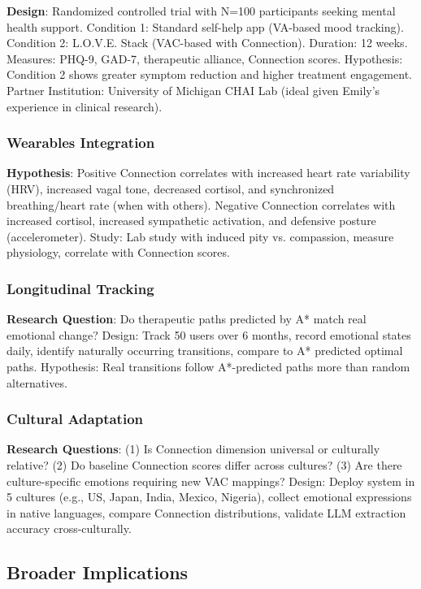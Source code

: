 \documentclass[10pt,twocolumn]{article}
\begin{document}
\textbf{Design}: Randomized controlled trial with N=100 participants seeking mental health support. Condition 1: Standard self-help app (VA-based mood tracking). Condition 2: L.O.V.E. Stack (VAC-based with Connection). Duration: 12 weeks. Measures: PHQ-9, GAD-7, therapeutic alliance, Connection scores. Hypothesis: Condition 2 shows greater symptom reduction and higher treatment engagement. Partner Institution: University of Michigan CHAI Lab (ideal given Emily's experience in clinical research).

\subsubsection{Wearables Integration}

\textbf{Hypothesis}: Positive Connection correlates with increased heart rate variability (HRV), increased vagal tone, decreased cortisol, and synchronized breathing/heart rate (when with others). Negative Connection correlates with increased cortisol, increased sympathetic activation, and defensive posture (accelerometer). Study: Lab study with induced pity vs. compassion, measure physiology, correlate with Connection scores.

\subsubsection{Longitudinal Tracking}

\textbf{Research Question}: Do therapeutic paths predicted by A* match real emotional change? Design: Track 50 users over 6 months, record emotional states daily, identify naturally occurring transitions, compare to A* predicted optimal paths. Hypothesis: Real transitions follow A*-predicted paths more than random alternatives.

\subsubsection{Cultural Adaptation}

\textbf{Research Questions}: (1) Is Connection dimension universal or culturally relative? (2) Do baseline Connection scores differ across cultures? (3) Are there culture-specific emotions requiring new VAC mappings? Design: Deploy system in 5 cultures (e.g., US, Japan, India, Mexico, Nigeria), collect emotional expressions in native languages, compare Connection distributions, validate LLM extraction accuracy cross-culturally.

\subsection{Broader Implications}
\end{document}
